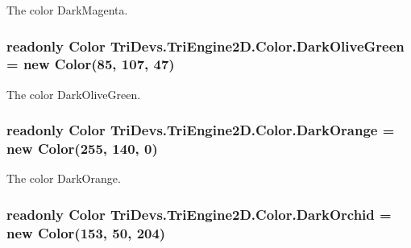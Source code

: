 The color Dark\-Magenta. 

\hypertarget{struct_tri_devs_1_1_tri_engine2_d_1_1_color_a98c76300450131740a6f9db12b033187}{
\subsubsection[{Dark\-Olive\-Green}]{\setlength{\rightskip}{0pt plus 5cm}readonly {\bf Color} Tri\-Devs.\-Tri\-Engine2\-D.\-Color.\-Dark\-Olive\-Green = new {\bf Color}(85, 107, 47)\hspace{0.3cm}{\ttfamily [static]}}}\label{struct_tri_devs_1_1_tri_engine2_d_1_1_color_a98c76300450131740a6f9db12b033187}


The color Dark\-Olive\-Green. 

\hypertarget{struct_tri_devs_1_1_tri_engine2_d_1_1_color_a68996d01f03c0337e3919bc30366be8a}{
\subsubsection[{Dark\-Orange}]{\setlength{\rightskip}{0pt plus 5cm}readonly {\bf Color} Tri\-Devs.\-Tri\-Engine2\-D.\-Color.\-Dark\-Orange = new {\bf Color}(255, 140, 0)\hspace{0.3cm}{\ttfamily [static]}}}\label{struct_tri_devs_1_1_tri_engine2_d_1_1_color_a68996d01f03c0337e3919bc30366be8a}


The color Dark\-Orange. 

\hypertarget{struct_tri_devs_1_1_tri_engine2_d_1_1_color_a41e6cb4d91cb0217e0df7e55a5c456db}{
\subsubsection[{Dark\-Orchid}]{\setlength{\rightskip}{0pt plus 5cm}readonly {\bf Color} Tri\-Devs.\-Tri\-Engine2\-D.\-Color.\-Dark\-Orchid = new {\bf Color}(153, 50, 204)\hspace{0.3cm}{\ttfamily [static]}}}\label{struct_tri_devs_1_1_tri_engine2_d_1_1_color_a41e6cb4d91cb0217e0df7e55a5c456db}


